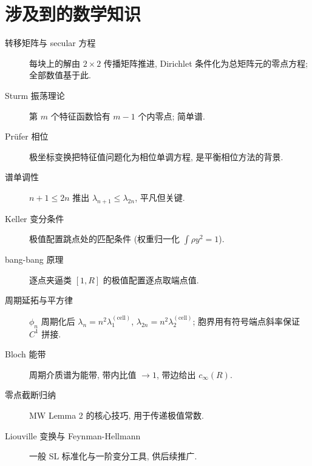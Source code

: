 \documentclass[UTF8]{ctexart}
\begin{document}
\section{涉及到的数学知识}

\begin{description}
	\item[转移矩阵与 secular 方程] 每块上的解由 $2\times 2$ 传播矩阵推进,
		Dirichlet 条件化为总矩阵元的零点方程; 全部数值基于此.
	\item[Sturm 振荡理论] 第 $m$ 个特征函数恰有 $m-1$ 个内零点; 简单谱.
	\item[Pr\"ufer 相位] 极坐标变换把特征值问题化为相位单调方程, 是平衡相位方法的背景.
	\item[谱单调性] $n+1 \leq 2n$ 推出 $\lambda_{n+1} \leq \lambda_{2n}$, 平凡但关键.
	\item[Keller 变分条件] 极值配置跳点处的匹配条件 (权重归一化 $\int \rho y^2 = 1$).
	\item[bang-bang 原理] 逐点夹逼类 $[1,R]$ 的极值配置逐点取端点值.
	\item[周期延拓与平方律] $\phi_n$ 周期化后 $\lambda_n = n^2\lambda_1^{(\text{cell})}$,
		$\lambda_{2n} = n^2\lambda_2^{(\text{cell})}$; 胞界用有符号端点斜率保证 $C^1$ 拼接.
	\item[Bloch 能带] 周期介质谱为能带, 带内比值 $\to 1$, 带边给出 $c_{\infty}(R)$.
	\item[零点截断归纳] MW Lemma 2 的核心技巧, 用于传递极值常数.
	\item[Liouville 变换与 Feynman-Hellmann] 一般 SL 标准化与一阶变分工具, 供后续推广.
\end{description}
\end{document}

